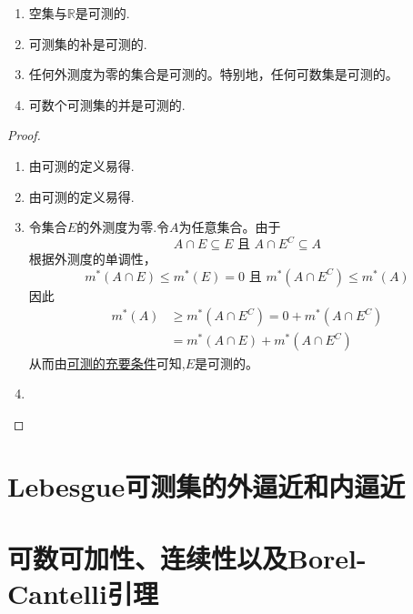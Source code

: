 \documentclass[lang=cn,newtx,10pt,scheme=chinese]{../Template/elegantbook}
\begin{document}
\begin{proposition}[可测集的性质]\label{proposition:可测集的性质}
\begin{enumerate}[(1)]
  \item 空集与$\mathbb{R}$是可测的.
  
  \item 可测集的补是可测的.

  \item 任何外测度为零的集合是可测的。特别地，任何可数集是可测的。
 
  \item 可数个可测集的并是可测的.
\end{enumerate}
\end{proposition}
\begin{proof}
\begin{enumerate}[(1)]
  \item 由可测的定义易得.

  \item 由可测的定义易得.

  \item  令集合\(E\)的外测度为零.令\(A\)为任意集合。由于
  \[A\cap E\subseteq E\text{ 且 }A\cap E^C\subseteq A\]
  根据外测度的单调性，
  \[m^*(A\cap E)\leqslant m^*(E)=0\text{ 且 }m^*(A\cap E^C)\leqslant m^*(A)\]
  因此
  \begin{align*}
  m^*(A)&\geqslant m^*(A\cap E^C)=0 + m^*(A\cap E^C)\\
  &=m^*(A\cap E)+m^*(A\cap E^C)
  \end{align*}
  从而由\hyperref[proposition:可测的充要条件1]{可测的充要条件}可知,\(E\)是可测的。

  \item 
\end{enumerate}

\end{proof}







\section{Lebesgue可测集的外逼近和内逼近}





\section{可数可加性、连续性以及Borel-Cantelli引理}
\end{document}
